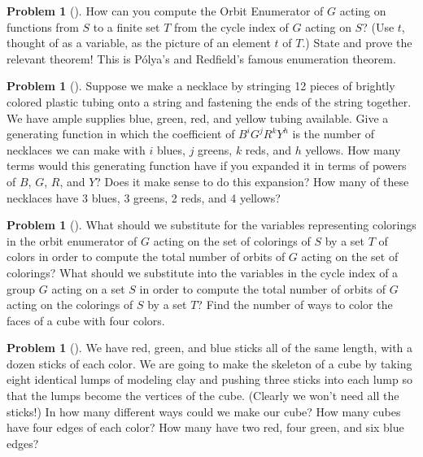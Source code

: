 \documentclass[10pt,]{book}
\theoremstyle{plain}
\theoremstyle{definition}
\newtheorem{activity}[project]{Problem}
\theoremstyle{definition}
\numberwithin{equation}{chapter}
\newcommand{\importantarrow}{\Rightarrow}
\begin{document}
\begin{activity}[]\marginsymbol[-1em]{} \label{activity-321}
How can you compute the Orbit Enumerator of \(G\) acting on functions from \(S\) to a finite set \(T\) from the cycle index of \(G\) acting on \(S\)? (Use \(t\), thought of as a variable, as the picture of an element \(t\) of \(T\).) State and prove the relevant theorem! This is Pólya's and Redfield's famous enumeration theorem.%
\end{activity}
\begin{activity}[]\marginsymbol[-1em]{\pdftooltip{$\importantarrow$}{especially interesting}} \label{activity-322}
Suppose we make a necklace by stringing 12 pieces of brightly colored plastic tubing onto a string and fastening the ends of the string together. We have ample supplies blue, green, red, and yellow tubing available. Give a generating function in which the coefficient of \(B^iG^jR^kY^h\) is the number of necklaces we can make with \(i\) blues, \(j\) greens, \(k\) reds, and \(h\) yellows. How many terms would this generating function have if you expanded it in terms of powers of \(B\), \(G\), \(R\), and \(Y\)? Does it make sense to do this expansion? How many of these necklaces have 3 blues, 3 greens, 2 reds, and 4 yellows?%
\end{activity}
\begin{activity}[]\marginsymbol[-1em]{} \label{activity-323}
What should we substitute for the variables representing colorings in the orbit enumerator of \(G\) acting on the set of colorings of \(S\) by a set \(T\) of colors in order to compute the total number of orbits of \(G\) acting on the set of colorings? What should we substitute into the variables in the cycle index of a group \(G\) acting on a set \(S\) in order to compute the total number of orbits of \(G\) acting on the colorings of \(S\) by a set \(T\)? Find the number of ways to color the faces of a cube with four colors.%
\end{activity}
\begin{activity}[]\marginsymbol[-1em]{\pdftooltip{$\importantarrow$}{especially interesting}} \label{coloredsticks}
We have red, green, and blue sticks all of the same length, with a dozen sticks of each color. We are going to make the skeleton of a cube by taking eight identical lumps of modeling clay and pushing three sticks into each lump so that the lumps become the vertices of the cube. (Clearly we won't need all the sticks!) In how many different ways could we make our cube? How many cubes have four edges of each color? How many have two red, four green, and six blue edges?%
\end{activity}
\end{document}

